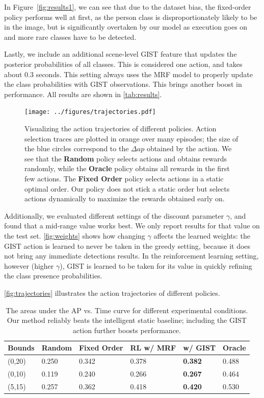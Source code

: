 In Figure~\autoref{fig:results1}, we can see that due to the dataset bias, the fixed-order policy performs well at first, as the person class is disproportionately likely to be in the image, but is significantly overtaken by our model as execution goes on and more rare classes have to be detected.

Lastly, we include an additional scene-level GIST feature that updates the posterior probabilities of all classes.
This is considered one action, and takes about $0.3$ seconds.
This setting always uses the MRF model to properly update the class probabilities with GIST observations.
This brings another boost in performance.
All results are shown in \autoref{tab:results}.

\begin{figure}[h!]
  \centering
  \texttt{[image: ../figures/trajectories.pdf]}
  \caption{
Visualizing the action trajectories of different policies.
Action selection traces are plotted in orange over many episodes; the size of the blue circles correspond to the $\Delta ap$ obtained by the action.
We see that the \textbf{Random} policy selects actions and obtains rewards randomly, while the \textbf{Oracle} policy obtains all rewards in the first few actions.
The \textbf{Fixed Order} policy selects actions in a static optimal order.
Our policy does not stick a static order but selects actions dynamically to maximize the rewards obtained early on.
}
  \label{fig:trajectories}
\end{figure}

Additionally, we evaluated different settings of the discount parameter $\gamma$, and found that a mid-range value works best.
We only report results for that value on the test set.
\autoref{fig:weights} shows how changing $\gamma$ affects the learned weights: the GIST action is learned to never be taken in the greedy setting, because it does not bring any immediate detections results.
In the reinforcement learning setting, however (higher $\gamma$), GIST is learned to be taken for its value in quickly refining the class presence probabilities.

\autoref{fig:trajectories} illustrates the action trajectories of different policies.

\begin{table}[t]
\caption{
The areas under the AP vs. Time curve for different experimental conditions.
Our method reliably beats the intelligent static baseline; including the GIST action further boosts performance.}
\label{tab:results}
\begin{center}
\begin{tabular}{|l|l|l|l|l|l|}
\hline
Bounds & Random & Fixed Order & RL w/ MRF & w/ GIST         & Oracle \\ \hline
(0,20) & 0.250  & 0.342       & 0.378     & \textbf{0.382}  & 0.488 \\ 
(0,10) & 0.119  & 0.240       & 0.266     & \textbf{0.267}  & 0.464 \\ 
(5,15) & 0.257  & 0.362       & 0.418     & \textbf{0.420}  & 0.530 \\ \hline
\end{tabular}
\end{center}
\end{table}
